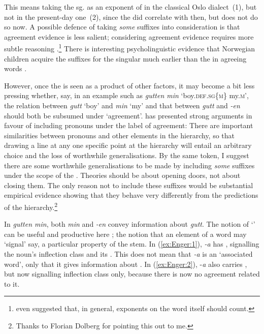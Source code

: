 \documentclass[output=paper]{langsci/langscibook}
\begin{document}
\begin{exe}
\begin{xlist}
\begin{xlist}
This means taking the  sg.  as an exponent of  in
the classical Oslo dialect~(1), but not in the present-day one~(2),
since the  did correlate with  then, but does not do so now.
A possible defence of taking \emph{some} suffixes into consideration is that
agreement evidence is less salient; considering agreement evidence
requires more subtle reasoning %
\citep[cf. also][766]{Carstairs-McCarthy1994}%
%
.\footnote{%
\citet{Wurzel86} %
%
even suggested that, in general, exponents
  on the word itself should count.} There is interesting
psycholinguistic evidence that Norwegian children acquire the suffixes
for the  singular much earlier than the  in agreeing words %
\citep[e.g.][]{Westergaard15,Westergaard16}
.

However, once the  is seen as a product of other
factors, it may become a bit less pressing whether, say, in an
example such as \emph{gutten min} `boy.\textsc{def}.\textsc{sg}\{\textsc{m}\} my.\textsc{m}', the relation
between \emph{gutt} `boy' and \emph{min} `my' and that between
\emph{gutt} and \emph{-en} should both be subsumed under `agreement'.
\citet[e.g.][]{Corbett2006} %
 has presented strong arguments in favour of
including pronouns under the label of agreement: There are important
similarities between pronouns and other elements in the hierarchy, so
that drawing a line at any one specific point at the hierarchy will
entail an arbitrary choice and the loss of worthwhile generalisations.
By the same token, I suggest there are some worthwhile generalisations
to be made by including \emph{some} suffixes under the scope of the
. Theories should be about opening doors, not about
closing them. The only reason not to include these suffixes would be
substantial empirical evidence showing that they behave very differently
from the predictions of the hierarchy.\footnote{Thanks to Florian
  Dolberg for pointing this out to me.}

In \emph{gutten min}, both \emph{min} and \emph{-en} convey information
about \emph{gutt}. The notion of `' can be
useful and productive here %
\citep[e.g.][]{Carstairs-McCarthy1994,Maiden2005,Enger2004a}%
%
; the notion that an element of a word may `signal' say, a
particular property of the stem. In (\ref{ex:Enger:1}), \emph{-a} has
, signalling the noun's inflection class and
its . This does not mean that \emph{-a} is an `associated word',
only that it gives information about . In (\ref{ex:Enger:2}), -\emph{a} also
carries , but now signalling inflection class
only, because there is now no  agreement related to it.


\end{xlist}
\end{xlist}
\end{exe}
\end{document}
